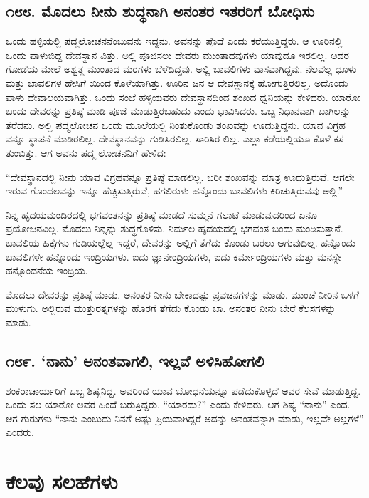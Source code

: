 \section{\num{೧೮೮. } ಮೊದಲು ನೀನು ಶುದ್ಧನಾಗಿ ಅನಂತರ ಇತರರಿಗೆ ಬೋಧಿಸು}

ಒಂದು ಹಳ್ಳಿಯಲ್ಲಿ ಪದ್ಮಲೋಚನನೆಂಬುವನು ಇದ್ದನು. ಅವನನ್ನು ಪೊದೆ ಎಂದು ಕರೆಯುತ್ತಿದ್ದರು. ಆ ಊರಿನಲ್ಲಿ ಒಂದು ಪಾಳುಬಿದ್ದ ದೇವಸ್ಥಾನ ವಿತ್ತು. ಅಲ್ಲಿ ಪೂಜಿಸಲು ದೇವರು ಮುಂತಾದವುಗಳು ಯಾವುದೂ ಇರಲಿಲ್ಲ. ಅದರ ಗೋಡೆಯ ಮೇಲೆ ಅಶ್ವತ್ಥ ಮುಂತಾದ ಮರಗಳು ಬೆಳೆದಿದ್ದವು. ಅಲ್ಲಿ ಬಾವಲಿಗಳು ವಾಸವಾಗಿದ್ದವು. ನೆಲವೆಲ್ಲ ಧೂಳು ಮತ್ತು ಬಾವಲಿಗಳ ಹೇಸಿಗೆ ಯಿಂದ ಕೊಳೆಯಾಗಿತ್ತು. ಊರಿನ ಜನ ಆ ದೇವಸ್ಥಾನಕ್ಕೆ ಹೋಗುತ್ತಿರಲಿಲ್ಲ. ಅದೊಂದು ಪಾಳು ದೇವಾಲಯವಾಗಿತ್ತು. ಒಂದು ಸಂಜೆ ಹಳ್ಳಿಯವರು ದೇವಸ್ಥಾನದಿಂದ ಶಂಖದ ಧ್ವನಿಯನ್ನು ಕೇಳಿದರು. ಯಾರೋ ಬಂದು ದೇವರನ್ನು ಪ್ರತಿಷ್ಠೆ ಮಾಡಿ ಪೂಜೆ ಮಾಡುತ್ತಿರಬಹುದು ಎಂದು ಭಾವಿಸಿದರು. ಒಬ್ಬ ನಿಧಾನವಾಗಿ ಬಾಗಿಲನ್ನು ತೆರೆದನು. ಅಲ್ಲಿ ಪದ್ಮಲೋಚನ ಒಂದು ಮೂಲೆಯಲ್ಲಿ ನಿಂತುಕೊಂಡು ಶಂಖವನ್ನು ಊದುತ್ತಿದ್ದನು. ಯಾವ ವಿಗ್ರಹ ವನ್ನೂ ಸ್ಥಾಪನೆ ಮಾಡಿರಲಿಲ್ಲ. ದೇವಸ್ಥಾನವನ್ನು ಗುಡಿಸಿರಲಿಲ್ಲ. ಸಾರಿಸಿರ ಲಿಲ್ಲ. ಎಲ್ಲಾ ಕಡೆಯಲ್ಲಿಯೂ ಕೊಳೆ ಕಸ ತುಂಬಿತ್ತು. ಆಗ ಅವನು ಪದ್ಮ ಲೋಚನನಿಗೆ ಹೇಳಿದ:

“ದೇವಸ್ಥಾನದಲ್ಲಿ ನೀನು ಯಾವ ವಿಗ್ರಹವನ್ನೂ ಪ್ರತಿಷ್ಠೆ ಮಾಡಲಿಲ್ಲ. ಬರೀ ಶಂಖವನ್ನು ಮಾತ್ರ ಊದುತ್ತಿರುವೆ. ಆಗಲೇ\\ಇರುವ ಗೊಂದಲವನ್ನು ಇನ್ನೂ ಹೆಚ್ಚಿಸುತ್ತಿರುವೆ, ಹಗಲಿರುಳು ಹನ್ನೊಂದು ಬಾವಲಿಗಳು ಕಿರಿಚುತ್ತಿರುವವು ಅಲ್ಲಿ.”

ನಿನ್ನ ಹೃದಯಮಂದಿರದಲ್ಲಿ ಭಗವಂತನನ್ನು ಪ್ರತಿಷ್ಠೆ ಮಾಡದೆ ಸುಮ್ಮನೆ ಗಲಾಟೆ ಮಾಡುವುದರಿಂದ ಏನೂ ಪ್ರಯೋಜನವಿಲ್ಲ. ಮೊದಲು ನಿನ್ನನ್ನು ಶುದ್ಧಗೊಳಿಸು. ನಿರ್ಮಲ ಹೃದಯದಲ್ಲಿ ಭಗವಂತ ಬಂದು ಮಂಡಿಸುತ್ತಾನೆ. ಬಾವಲಿಯ ಹಿಕ್ಕೆಗಳು ಗುಡಿಯಲ್ಲೆಲ್ಲ ಇದ್ದರೆ, ದೇವರನ್ನು ಅಲ್ಲಿಗೆ ತೆಗೆದು ಕೊಂಡು ಬರಲು ಆಗುವುದಿಲ್ಲ. ಹನ್ನೊಂದು ಬಾವಲಿಗಳೇ ಹನ್ನೊಂದು ಇಂದ್ರಿಯಗಳು. ಐದು ಜ್ಞಾನೇಂದ್ರಿಯಗಳು, ಐದು ಕರ್ಮೇಂದ್ರಿಯಗಳು ಮತ್ತು ಮನಸ್ಸೇ ಹನ್ನೊಂದನೆಯ ಇಂದ್ರಿಯ.

ಮೊದಲು ದೇವರನ್ನು ಪ್ರತಿಷ್ಠೆ ಮಾಡು. ಅನಂತರ ನೀನು ಬೇಕಾದಷ್ಟು ಪ್ರವಚನಗಳನ್ನು ಮಾಡು. ಮುಂಚೆ ನೀರಿನ ಒಳಗೆ ಮುಳುಗು. ಅಲ್ಲಿರುವ ಮುತ್ತುರತ್ನಗಳನ್ನು ಹೊರಗೆ ತೆಗೆದು ಕೊಂಡು ಬಾ. ಅನಂತರ ನೀನು ಬೇರೆ ಕೆಲಸಗಳನ್ನು ಮಾಡು.


\section{\num{೧೮೯. } ‘ನಾನು’ ಅನಂತವಾಗಲಿ, ಇಲ್ಲವೆ ಅಳಿಸಿಹೋಗಲಿ}

ಶಂಕರಾಚಾರ್ಯರಿಗೆ ಒಬ್ಬ ಶಿಷ್ಯನಿದ್ದ. ಅವರಿಂದ ಯಾವ ಬೋಧನೆಯನ್ನೂ ಪಡೆದುಕೊಳ್ಳದೆ ಅವರ ಸೇವೆ ಮಾಡುತ್ತಿದ್ದ. ಒಂದು ಸಲ ಯಾರೋ ಅವರ ಹಿಂದೆ ಬರುತ್ತಿದ್ದರು. “ಯಾರದು?” ಎಂದು ಕೇಳಿದರು. ಆಗ ಶಿಷ್ಯ “ನಾನು” ಎಂದ. ಆಗ ಗುರುಗಳು “ನಾನು ಎಂಬುದು ನಿನಗೆ ಅಷ್ಟು ಪ್ರಿಯವಾಗಿದ್ದರೆ ಅದನ್ನು ಅನಂತವನ್ನಾಗಿ ಮಾಡು, ಇಲ್ಲವೇ ಅಲ್ಲಗಳೆ” ಎಂದರು.

\chapter{ಕೆಲವು ಸಲಹೆಗಳು}

